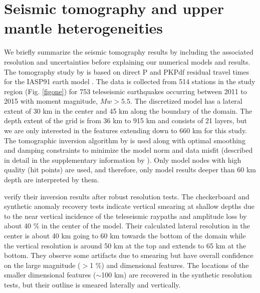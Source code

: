 \documentclass[draft,linenumbers]{agujournal2018}
\begin{document}
\section{Seismic tomography and upper mantle heterogeneities}
We briefly summarize the seismic tomography results by \citet{Biryol_2016} including the associated resolution and uncertainties before explaining our numerical models and results. The tomography study by \citet{Biryol_2016} is based on direct P and PKPdf residual travel times for the IASP91 earth model \citep{kennett1991traveltimes}. The data is collected from 514 stations in the study region (Fig. \ref{figone}) for 753 teleseismic earthquakes occurring between 2011 to 2015 with moment magnitude, $Mw > 5.5$. The discretized model has a lateral extent of 30 km in the center and 45 km along the boundary of the domain. The depth extent of the grid is from 36 km to 915 km and consists of 21 layers, but we are only interested in the features extending down to 660 km for this study. The tomographic inversion algorithm by \citet{schmandt2010seismic} is used along with optimal smoothing and damping constraints to minimize the model norm and data misfit (described in detail in the supplementary information by \citet{Biryol_2016}). Only model nodes with high quality (hit points) are used, and therefore, only model results deeper than 60 km depth are interpreted by them.
    
    \citet{Biryol_2016} verify their inversion results after robust resolution tests. The checkerboard and synthetic anomaly recovery tests indicate vertical smearing at shallow depths due to the near vertical incidence of the teleseismic raypaths and amplitude loss by about 40 \% in the center of the model. Their calculated lateral resolution in the center is about 40 km going to 60 km towards the bottom of the domain while the vertical resolution  is around 50 km at the top and extends to 65 km at the bottom. They observe some artifacts due to smearing but have overall confidence on the large magnitude ($>$1 \%) and dimensional features. The locations of the smaller dimensional features ($\sim$100 km) are recovered in the synthetic resolution tests, but their outline is smeared laterally and vertically. 
    
\end{document}
